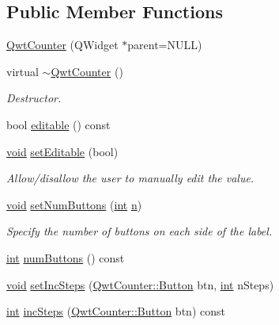 \subsection*{Public Member Functions}
\begin{DoxyCompactItemize}
\item 
\hyperlink{class_qwt_counter_aee94cdbaf1f3d22e110fd3535dbca34a}{Qwt\-Counter} (Q\-Widget $\ast$parent=N\-U\-L\-L)
\item 
virtual \hyperlink{class_qwt_counter_a6469133eb210b470023a3dcc735aec4d}{$\sim$\-Qwt\-Counter} ()
\begin{DoxyCompactList}\small\item\em Destructor. \end{DoxyCompactList}\item 
bool \hyperlink{class_qwt_counter_a8817a2b253273d694b02a81feb76ef64}{editable} () const 
\item 
\hyperlink{group___u_a_v_objects_plugin_ga444cf2ff3f0ecbe028adce838d373f5c}{void} \hyperlink{class_qwt_counter_a2d2f4bf2813d2aa30c2fb9ec7a90163c}{set\-Editable} (bool)
\begin{DoxyCompactList}\small\item\em Allow/disallow the user to manually edit the value. \end{DoxyCompactList}\item 
\hyperlink{group___u_a_v_objects_plugin_ga444cf2ff3f0ecbe028adce838d373f5c}{void} \hyperlink{class_qwt_counter_ae9241fda2e375becdb484cc2cf7752f4}{set\-Num\-Buttons} (\hyperlink{ioapi_8h_a787fa3cf048117ba7123753c1e74fcd6}{int} \hyperlink{glext_8h_a4eacae1d9e7c39f8236bb36d4ececa77}{n})
\begin{DoxyCompactList}\small\item\em Specify the number of buttons on each side of the label. \end{DoxyCompactList}\item 
\hyperlink{ioapi_8h_a787fa3cf048117ba7123753c1e74fcd6}{int} \hyperlink{class_qwt_counter_ac160c5e7a1c7f858b7f52ff0904ea142}{num\-Buttons} () const 
\item 
\hyperlink{group___u_a_v_objects_plugin_ga444cf2ff3f0ecbe028adce838d373f5c}{void} \hyperlink{class_qwt_counter_a6aa68e7fc717fb0e2e48a978301c96eb}{set\-Inc\-Steps} (\hyperlink{class_qwt_counter_a027cfd91946ca9a19a1d606411e0f374}{Qwt\-Counter\-::\-Button} btn, \hyperlink{ioapi_8h_a787fa3cf048117ba7123753c1e74fcd6}{int} n\-Steps)
\item 
\hyperlink{ioapi_8h_a787fa3cf048117ba7123753c1e74fcd6}{int} \hyperlink{class_qwt_counter_a9c81b37e547358cc588311d941649de1}{inc\-Steps} (\hyperlink{class_qwt_counter_a027cfd91946ca9a19a1d606411e0f374}{Qwt\-Counter\-::\-Button} btn) const 

\end{DoxyCompactItemize}
